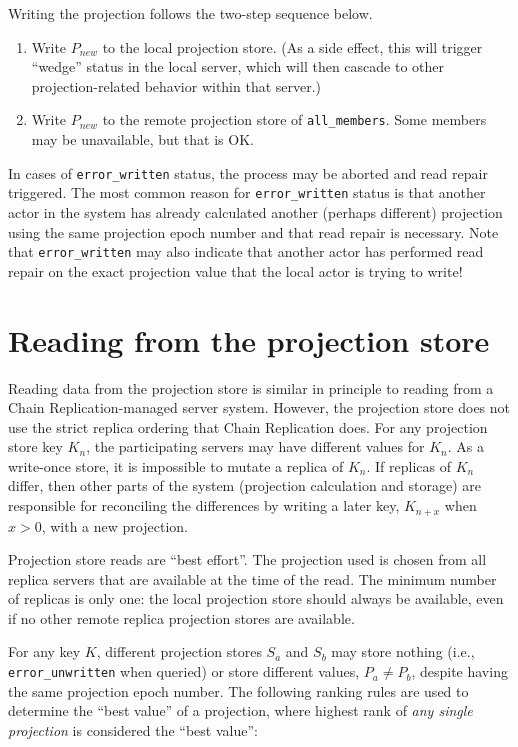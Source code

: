 \documentclass[preprint,10pt]{sigplanconf}
\begin{document}
Writing the projection follows the two-step sequence below.

\begin{enumerate}
\item Write $P_{new}$ to the local projection store.  (As a side
  effect,
  this will trigger
  ``wedge'' status in the local server, which will then cascade to other
  projection-related behavior within that server.)
\item Write $P_{new}$ to the remote projection store of {\tt all\_members}.
  Some members may be unavailable, but that is OK.
\end{enumerate}

In cases of {\tt error\_written} status,
the process may be aborted and read repair
triggered.  The most common reason for {\tt error\_written} status
is that another actor in the system has
already calculated another (perhaps different) projection using the
same projection epoch number and that
read repair is necessary.  Note that {\tt error\_written} may also
indicate that another actor has performed read repair on the exact
projection value that the local actor is trying to write!

\section{Reading from the projection store}
\label{sec:proj-store-reading}

Reading data from the projection store is similar in principle to
reading from a Chain Replication-managed server system.  However, the
projection store does not use the strict replica ordering that
Chain Replication does.  For any projection store key $K_n$, the
participating servers may have different values for $K_n$.  As a
write-once store, it is impossible to mutate a replica of $K_n$.  If
replicas of $K_n$ differ, then other parts of the system (projection
calculation and storage) are responsible for reconciling the
differences by writing a later key,
$K_{n+x}$ when $x>0$, with a new projection.

Projection store reads are ``best effort''.  The projection used is chosen from
all replica servers that are available at the time of the read.  The
minimum number of replicas is only one: the local projection store
should always be available, even if no other remote replica projection
stores are available.

For any key $K$, different projection stores $S_a$ and $S_b$ may store
nothing (i.e., {\tt error\_unwritten} when queried) or store different
values, $P_a \ne P_b$, despite having the same projection epoch
number.  The following ranking rules are used to
determine the ``best value'' of a projection, where highest rank of
{\em any single projection} is considered the ``best value'':
\end{document}
